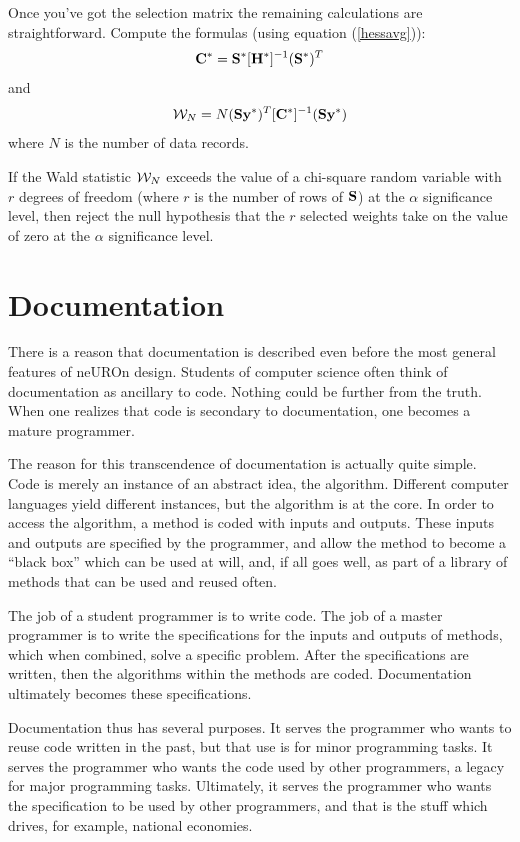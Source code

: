 \documentclass{report}
\begin{document}
Once you've got the selection matrix the remaining calculations are
straightforward.  Compute the formulas (using equation
(\ref{hessavg})):
\begin{equation}
{\bf C}^* = {\bf S}^* [{\bf H}^*]^{-1} ({\bf S}^*)^{T}
\end{equation}
and
\begin{equation}
{\cal W}_N = N ({\bf S}{\bf y}^*)^T [{\bf C}^*]^{-1} ({\bf S} {\bf y}^
*)
\end{equation}
where $N$ is the number of data records.

If the Wald statistic ${\cal W}_N$ exceeds the value of a chi-square
random variable with $r$ degrees of freedom (where $r$ is the number
of rows of ${\bf S}$) at the $\alpha$ significance level, then reject
the null hypothesis that the $r$ selected weights take on the value of
zero at the $\alpha$ significance level.

\chapter{Documentation}\label{documentation}

There is a reason that documentation is described even before the most
general features of neUROn design.  Students of computer science often
think of documentation as ancillary to code.  Nothing could be further
from the truth.  When one realizes that code is secondary to
documentation, one becomes a mature programmer.

The reason for this transcendence of documentation is actually quite
simple.  Code is merely an instance of an abstract idea, the
algorithm.  Different computer languages yield different instances,
but the algorithm is at the core.  In order to access the algorithm, a
method is coded with inputs and outputs.  These inputs and outputs are
specified by the programmer, and allow the method to become a ``black
box'' which can be used at will, and, if all goes well, as part of a
library of methods that can be used and reused often.

The job of a student programmer is to write code.  The job of a master
programmer is to write the specifications for the inputs and outputs
of methods, which when combined, solve a specific problem.  After the
specifications are written, then the algorithms within the methods are
coded.  Documentation ultimately becomes these specifications.

Documentation thus has several purposes.  It serves the programmer who
wants to reuse code written in the past, but that use is for minor
programming tasks.  It serves the programmer who wants the code used
by other programmers, a legacy for major programming tasks.
Ultimately, it serves the programmer who wants the specification to be
used by other programmers, and that is the stuff which drives, for
example, national economies.
\end{document}

